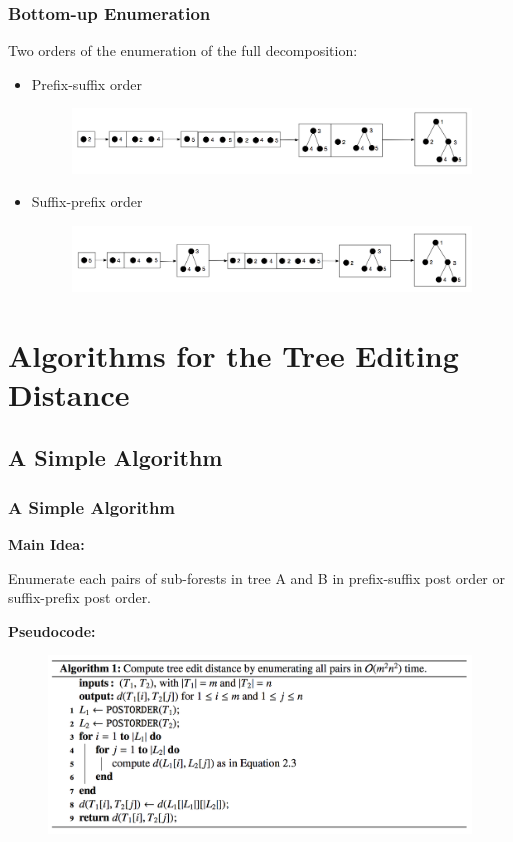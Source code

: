 \documentclass{beamer}
\begin{document}
\begin{frame}
\frametitle{Bottom-up Enumeration}
Two orders of the enumeration of the full decomposition:
\begin{itemize}
\item Prefix-suffix order%
\begin{figure}
	\includegraphics[width=1.0\linewidth]{PrefixSuffix}
	\centering
\end{figure}
\item Suffix-prefix order%
\begin{figure}
	\includegraphics[width=1.0\linewidth]{SuffixPrefix}
	\centering
\end{figure}
\end{itemize}
\end{frame}
\section{Algorithms for the Tree Editing Distance}
\subsection{A Simple Algorithm}
\begin{frame}
\frametitle{A Simple Algorithm}
\textbf{Main Idea:}

Enumerate each pairs of sub-forests in tree A and B in prefix-suffix post order or suffix-prefix post order.

\textbf{Pseudocode:}
\begin{figure}
	\includegraphics[width=1.0\linewidth]{SimpleAlgorithm}
	\centering
\end{figure}
\end{frame}
\end{document}
